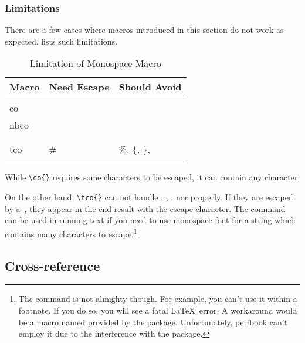 \subsubsection{Limitations}
\label{sec:app:styleguide:Limitations}

There are a few cases where macros introduced in this section
do not work as expected.
lists such limitations.

\begin{table}
\renewcommand*{\arraystretch}{1.2}\centering\footnotesize
\begin{tabular}{@{}lll@{}}\toprule
  Macro &  Need Escape & Should Avoid \\
  \midrule
  \co{\\co}, \co{\\nbco} & \co{\\}, \%, \{, \} & \\
  \co{\\tco}  & \# & \%, \{, \}, \co{\\} \\
  \bottomrule
\end{tabular}
\caption{Limitation of Monospace Macro}
\label{tab:app:styleguide:Limitation of Monospace Macro}
\end{table}

While \verb|\co{}| requires some characters to be escaped,
it can contain any character.

On the other hand, \verb|\tco{}| can not handle
\qco{\%}, \qco{\{}, \qco{\}}, nor \qco{\\} properly.
If they are escaped by a~\qco{\\},
they appear in the end result with the escape character.
The \qco{\\verb} command can be used in running text if you
need to use monospace font for a string which contains
many characters to escape.\footnote{
  The \co{\\verb} command is not almighty though.
  For example, you can't use it within a footnote.
  If you do so, you will see a fatal \LaTeX\ error.
  A workaround would be a macro named \co{\\VerbatimFootnotes}
  provided by the  package.
  Unfortunately, perfbook can't employ it due to the interference
  with the  package.
  }

\subsection{Cross-reference}
\label{sec:app:styleguide:Cross-Reference}

